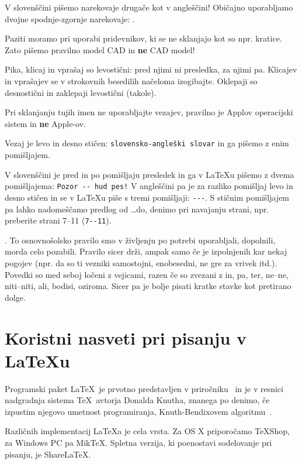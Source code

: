 \documentclass[a4paper, 12pt]{book}
\begin{document}
V slovenščini pišemo narekovaje drugače kot v angleščini!   
Običajno uporabljamo dvojne spodnje-zgornje narekovaje:  .

Paziti moramo pri uporabi pridevnikov, ki se ne sklanjajo kot so npr. kratice. 
Zato pišemo pravilno model CAD in \textbf{ne} CAD model!

Pika, klicaj in vprašaj so levostični: pred njimi ni presledka, za njimi pa. 
Klicajev in vprašajev se v strokovnih besedilih načeloma izogibajte. Oklepaji so desnostični in zaklepaji levostični (takole).

Pri sklanjanju tujih imen ne uporabljajte vezajev, pravilno je Applov operacijski sistem in \textbf{ne} Apple-ov.

Vezaj  je levo in desno stičen: \verb=slovensko-angleški slovar= in ga pišemo z enim pomišljajem.

V slovenščini je pred in po pomišljaju presledek in ga v LaTeXu pišemo z dvema pomišljajema: \verb=Pozor -- hud pes!=
V angleščini pa je za razliko pomišljaj levo in desno stičen in se v LaTeXu piše s tremi  pomišljaji: \verb=---=.
S stičnim pomišljajem pa lahko nadomeščamo predlog od \dots do, denimo pri navajanju strani, npr. preberite strani 7--11 (\verb=7--11=).



. To osnovnošolsko pravilo smo v življenju po potrebi uporabljali, dopolnili, morda celo pozabili. 
Pravilo sicer drži, ampak samo če je izpolnjenih kar nekaj pogojev (npr. da so ti vezniki samostojni, enobesedni, ne gre za vrivek itd.).
Povedki so med seboj ločeni z vejicami, razen če so zvezani z in, pa, ter, ne–ne, niti–niti, ali, bodisi, oziroma.
Sicer pa je bolje pisati kratke stavke kot pretirano dolge.


\chapter{Koristni nasveti pri pisanju v \LaTeX{u}}   %
\label{latex}

Programski paket \LaTeX\ je prvotno predstavljen v priročniku~\cite{lamport} in je v resnici nadgradnja sistema \TeX\ avtorja Donalda Knutha, znanega po denimo, če izpustim njegovo umetnost programiranja, 
Knuth-Bendixovem algoritmu~\cite{knuth1983simple}.

Različnih implementacij \LaTeX{}a je cela vrsta.
Za OS X priporočamo TeXShop, za Windows PC pa MikTeX. Spletna verzija, ki poenostavi sodelovanje pri pisanju, je ShareLaTeX.
\end{document}
